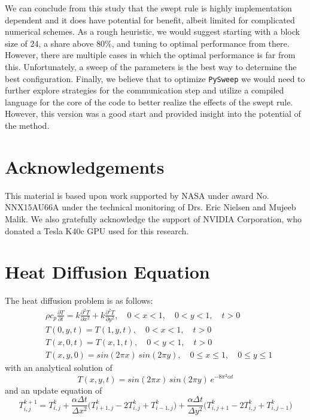 \documentclass[review]{elsarticle}
\def\pysweep{\texttt{PySweep}}
\begin{document}
We can conclude from this study that the swept rule is highly implementation dependent and it does have potential for benefit, albeit limited for complicated numerical schemes. As a rough heuristic, we would suggest starting with a block size of 24, a share above 80\%, and tuning to optimal performance from there. However, there are multiple cases in which the optimal performance is far from this. Unfortunately, a sweep of the parameters is the best way to determine the best configuration. Finally, we believe that to optimize \pysweep{} we would need to further explore strategies for the communication step and utilize a compiled language for the core of the code to better realize the effects of the swept rule. However, this version was a good start and provided insight into the potential of the method. 

\section{Acknowledgements}
This material is based upon work supported by NASA under award No. NNX15AU66A under the technical monitoring of Drs. Eric Nielsen and Mujeeb Malik. We also gratefully acknowledge the support of NVIDIA Corporation, who donated a
Tesla K40c GPU used for this research.





\appendix

\renewcommand*{\thesection}{\appendixname~\Alph{section}}
\section{Heat Diffusion Equation}
\label{Heat-Diffusion}
The heat diffusion problem is as follows:
\begin{align*}
    &\rho c_p \frac{\partial T}{\partial t} = k\frac{\partial^2 T}{\partial x^2}+k\frac{\partial^2 T}{\partial y^2},\quad 0<x<1,\quad 0<y<1,\quad t>0\\
    &T(0,y,t) = T(1,y,t),\quad 0<x<1,\quad t>0\\
    &T(x,0,t) = T(x,1,t),\quad 0<y<1,\quad t>0\\
    &T(x,y,0) = sin(2\pi x)\,sin(2\pi y), \quad 0\leq x\leq 1,\quad 0 \leq y \leq 1
\end{align*}
with an analytical solution of
\begin{equation*}
\label{heat-analyt}
    T(x,y,t) = sin(2\pi x)\,sin(2\pi y)\,e^{-8\pi^2\alpha t}
\end{equation*}
and an update equation of 
\begin{equation*}
    \label{heat-update}
    T_{i,j}^{k+1} = T_{i,j}^{k}+\frac{\alpha \Delta t}{\Delta x^2}\big(T_{i+1,j}^{k}-2T_{i,j}^{k}+T_{i-1,j}^{k}\big)+\frac{\alpha \Delta t}{\Delta y^2}\big(T_{i,j+1}^{k}-2T_{i,j}^{k}+T_{i,j-1}^{k}\big)
\end{equation*}
\end{document}
